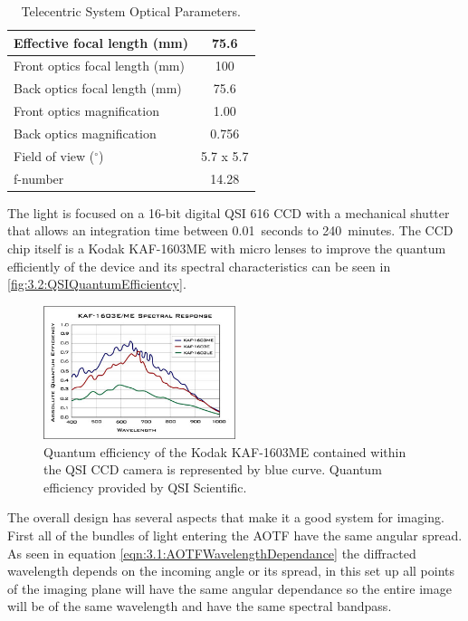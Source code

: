 \begin{table}
    \begin{center}
    \begin{tabular}{|l|c|}
    \hline
    Effective focal length (mm) & 75.6 \\
    \hline
    Front optics focal length (mm) & 100 \\
    \hline
    Back optics focal length (mm) & 75.6 \\
    \hline
    Front optics magnification & 1.00 \\
    \hline
    Back optics magnification & 0.756 \\
    \hline
    Field of view ($^{\circ}$) & 5.7 x 5.7 \\
    \hline
    f-number & 14.28 \\
    \hline
    \end{tabular}
    \end{center}
    \caption{Telecentric System Optical Parameters.}
    \label{tab:3.2:telecenticSystemParameters}
\end{table}

The light is focused on a 16-bit digital QSI 616 CCD with a mechanical shutter that allows an integration time between 0.01~seconds to 240~minutes. The CCD chip itself is a Kodak KAF-1603ME with micro lenses to improve the quantum efficiently of the device and its spectral characteristics can be seen in \autoref{fig:3.2:QSIQuantumEfficientcy}.

\begin{figure}
    \begin{center}
    \includegraphics[width=0.5\textwidth]{./Images/3-2-QsiCcdQe.jpg}
    \caption[QSI 616 Camera Quantum Efficiency]{Quantum efficiency of the Kodak KAF-1603ME contained within the QSI CCD camera is represented by blue curve. Quantum efficiency provided by QSI Scientific. }
    \label{fig:3.2:QSIQuantumEfficientcy}
    \end{center}
\end{figure}

The overall design has several aspects that make it a good system for imaging. First all of the bundles of light entering the AOTF have the same angular spread. As seen in equation \autoref{eqn:3.1:AOTFWavelengthDependance} the diffracted wavelength depends on the incoming angle or its spread, in this set up all points of the imaging plane will have the same angular dependance so the entire image will be of the same wavelength and have the same spectral bandpass.

